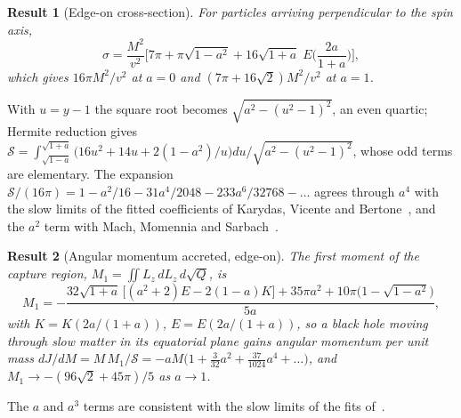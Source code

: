 \documentclass[11pt,a4paper]{article}
\newtheorem{result}{Result}
\theoremstyle{remark}
\numberwithin{equation}{section}
\begin{document}
\begin{result}[Edge-on cross-section]\label{res:slow}
For particles arriving perpendicular to the spin axis,
\begin{equation}
\sigma=\frac{M^2}{v^2}\Big[7\pi+\pi\sqrt{1-a^2}+16\sqrt{1+a}\;E\Big(\frac{2a}{1+a}\Big)\Big],
\label{eq:slow}
\end{equation}
which gives $16\pi M^2/v^2$ at $a=0$ and $(7\pi+16\sqrt2)M^2/v^2$ at $a=1$.
\end{result}
With $u=y-1$ the square root becomes $\sqrt{a^2-(u^2-1)^2}$, an even quartic; Hermite reduction gives
$\mathcal S=\int_{\sqrt{1-a}}^{\sqrt{1+a}}\big(16u^2+14u+2(1-a^2)/u\big)du/\sqrt{a^2-(u^2-1)^2}$, whose odd terms are
elementary. The expansion $\mathcal S/(16\pi)=1-a^2/16-31a^4/2048-233a^6/32768-\dots$ agrees through $a^4$ with
the slow limits of the fitted coefficients of Karydas, Vicente and Bertone~\cite{Karydas2026}, and the $a^2$ term with
Mach, Momennia and Sarbach~\cite{MachMomenniaSarbach2026}.

\begin{result}[Angular momentum accreted, edge-on]\label{res:M1}
The first moment of the capture region, $M_1=\iint L_z\,dL_z\,d\sqrt Q$, is
\begin{equation}
M_1=-\frac{32\sqrt{1+a}\,\big[(a^2+2)E-2(1-a)K\big]+35\pi a^2+10\pi\big(1-\sqrt{1-a^2}\big)}{5a},
\end{equation}
with $K=K(2a/(1+a))$, $E=E(2a/(1+a))$, so a black hole moving through slow matter in its equatorial plane gains angular momentum per unit mass
$dJ/dM=M\,M_1/\mathcal S=-aM\big(1+\tfrac{3}{32}a^2+\tfrac{37}{1024}a^4+\dots\big)$, and
$M_1\to-(96\sqrt2+45\pi)/5$ as $a\to1$.
\end{result}
The $a$ and $a^3$ terms are consistent with the slow limits of the fits of~\cite{Karydas2026}.
\end{document}
